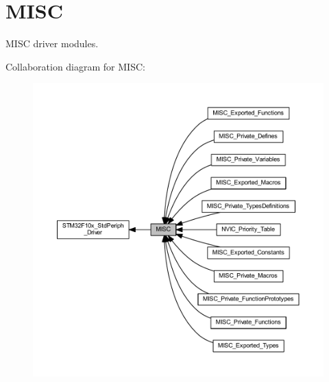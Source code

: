 \hypertarget{group___m_i_s_c}{}\section{M\+I\+SC}
\label{group___m_i_s_c}


M\+I\+SC driver modules.  


Collaboration diagram for M\+I\+SC\+:
\nopagebreak
\begin{figure}[H]
\begin{center}
\leavevmode
\includegraphics[width=350pt]{group___m_i_s_c}
\end{center}
\end{figure}
